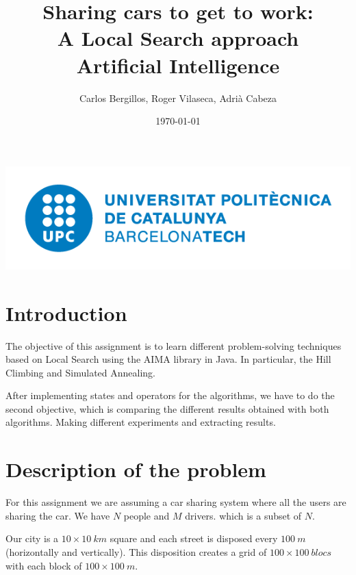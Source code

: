 \documentclass[12]{article}
\author{Carlos Bergillos, Roger Vilaseca, Adrià Cabeza}
\title{\textbf{Sharing cars to get to work:\\ A Local Search approach}\\ \bigskip Artificial Intelligence}
\date{\today}
\begin{document}
\maketitle
\vspace*{\fill}
\begin{center}
\includegraphics[scale=0.5]{images/UPClogo.png}
\end{center}

\newpage
\tableofcontents
\newpage
\section{Introduction}

The objective of this assignment is to learn different problem-solving techniques based on Local Search using the AIMA library in Java.
In particular, the Hill Climbing and Simulated Annealing.

After implementing states and operators for the algorithms, we have to do the second objective, which is comparing the different results obtained with both algorithms.
Making different experiments and extracting results.

\section{Description of the problem}

For this assignment we are assuming a car sharing system where all the users are sharing the car. We have $N$ people and $M$ drivers. which is a subset of $N$. 

Our city is a $10\times10\ km$ square and each street is disposed every $100\ m$ (horizontally and vertically). This disposition creates a grid of $100\times100\ blocs$ with each block of $100\times100\ m$.
\end{document}
